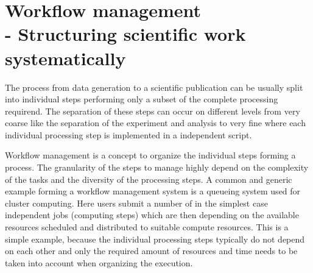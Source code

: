 \clearpage
\chapter[Workflow management]{Workflow management\\- Structuring scientific work systematically}
\label{sec:workflows}
The process from data generation to a scientific publication can be usually split into individual steps performing only a subset of the complete processing requirend. The separation of these steps can occur on different levels from very coarse like the separation of the experiment and analysis to very fine where each individual processing step is implemented in a independent script.

Workflow management is a concept to organize the individual steps forming a process. The granularity of the steps to manage highly depend on the complexity of the tasks and the diversity of the processing steps. A common and generic example forming a workflow management system is a queueing system used for cluster computing. Here users submit a number of in the simplest case independent jobs (computing steps) which are then depending on the available resources scheduled and distributed to suitable compute resources. This is a simple example, because the individual processing steps typically do not depend on each other and only the required amount of resources and time needs to be taken into account when organizing the execution.

